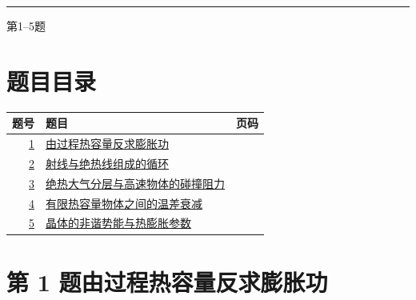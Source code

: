 \documentclass[UTF8,fontset=fandol,a4paper,11pt]{ctexart}
\begin{document}

\thispagestyle{empty}\vspace*{22mm}

\par\vspace{12mm}

\par\vspace{12mm}

\par\vspace{9mm}

\noindent\textcolor{accent}{\rule{\linewidth}{1pt}}\par\vspace{9mm}

\noindent 第1--5题\par\vfill\clearpage

\section*{题目目录}

\begin{longtable}{@{}r p{113mm} r@{}}\toprule 题号 & 题目 & 页码\\\midrule

\hyperref[q:1]{1} & \hyperref[q:1]{由过程热容量反求膨胀功} & \pageref{q:1} \\

\hyperref[q:2]{2} & \hyperref[q:2]{射线与绝热线组成的循环} & \pageref{q:2} \\

\hyperref[q:3]{3} & \hyperref[q:3]{绝热大气分层与高速物体的碰撞阻力} & \pageref{q:3} \\

\hyperref[q:4]{4} & \hyperref[q:4]{有限热容量物体之间的温差衰减} & \pageref{q:4} \\

\hyperref[q:5]{5} & \hyperref[q:5]{晶体的非谐势能与热膨胀参数} & \pageref{q:5} \\

\bottomrule\end{longtable}

\clearpage


\section*{第 1 题\quad 由过程热容量反求膨胀功}\label{q:1}
\end{document}
